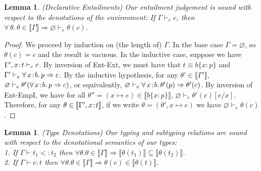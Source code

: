 \documentclass[11pt]{article}
\newtheorem{lemma}[theorem]{Lemma}
\newcommand{\bind}{\hspace{0.1em}{:}\hspace{0.1em}} %
\newcommand{\col}{\mathbin{:}}       %
\newcommand{\lb}{\llbracket}         %
\newcommand{\rb}{\rrbracket}         %
\begin{document}
\begin{lemma}{(Declarative Entailments) Our entailment judgement is sound with respect to the denotations of the environment:
If $\Gamma \vdash_e c$, then $\forall\, \theta.\, \theta \in \lb\Gamma\rb \Rightarrow \varnothing \vdash_e \theta(c)$.}
\label{decl-impl}
\end{lemma}

\begin{proof} We proceed by induction on (the length of) $\Gamma$. In the base case $\Gamma = \varnothing$, so $\theta(c) = c$ and the result is vacuous.
In the inductive case, suppose we have $\Gamma', x\bind t \vdash_e c$.
By inversion of {\sc Ent-Ext}, we must have that $t \equiv b\{x\col p\}$ and $\Gamma' \vdash_e \forall\,x\bind b.\, p \Rightarrow c$. By the inductive hypothesis, for any $\theta' \in \lb\Gamma'\rb$, $\varnothing \vdash_e \theta'(\forall\, x\bind b.\, p \Rightarrow c)$, or equivalently, $\varnothing \vdash_e \forall\, x\bind b.\, \theta'(p) \Rightarrow \theta'(c)$. By inversion of {\sc Ent-EmpI}, we have for all $\theta'' = (x\mapsto e) \in \lb b\{x\col p\}\rb$, $\varnothing \vdash_e \theta'(c)[e/x]$. Therefore, for any $\theta \in \lb \Gamma', x\bind t\rb$, if we write $\theta=(\theta', x\mapsto e)$ we have $\varnothing \vdash_e \theta(c)$.
\end{proof}


\begin{lemma}{(Type Denotations) Our typing and subtyping relations are sound with respect to the denotational semantics of our types:\\
1. If $\Gamma \vdash t_1 <: t_2$ then $\forall \theta. \theta \in \lb \Gamma \rb \Rightarrow \lb\theta(t_1)\rb \subseteq \lb\theta(t_2)\rb$.\\
2. If $\Gamma \vdash e : t$ then $\forall \theta. \theta \in \lb \Gamma \rb \Rightarrow \theta(e) \in \lb\theta(t)\rb.$
}\label{type-denote}
\end{lemma}
\end{document}
